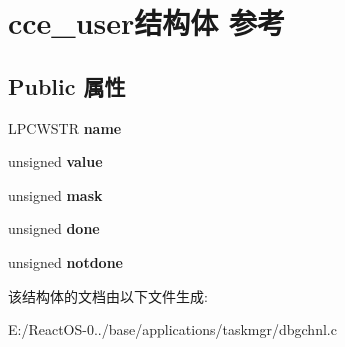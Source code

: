 \hypertarget{structcce__user}{}\section{cce\+\_\+user结构体 参考}
\label{structcce__user}
\subsection*{Public 属性}
\begin{DoxyCompactItemize}
\item 
\mbox{\label{structcce__user_a0f1f371ff5d4b1bd6fbf783fc45a9298}} 
L\+P\+C\+W\+S\+TR {\bfseries name}
\item 
\mbox{\label{structcce__user_a75a54bca917755cc022e14eb28f2d7bb}} 
unsigned {\bfseries value}
\item 
\mbox{\label{structcce__user_a26d51f0dcd2b9c58bd444f54a49fdd52}} 
unsigned {\bfseries mask}
\item 
\mbox{\label{structcce__user_a8aeaba8f363621425c1773234067188c}} 
unsigned {\bfseries done}
\item 
\mbox{\label{structcce__user_aaf72f6645aad12f005bf8c3e4b0162b7}} 
unsigned {\bfseries notdone}
\end{DoxyCompactItemize}


该结构体的文档由以下文件生成\+:\begin{DoxyCompactItemize}
\item 
E\+:/\+React\+O\+S-\/0../base/applications/taskmgr/dbgchnl.\+c\end{DoxyCompactItemize}

